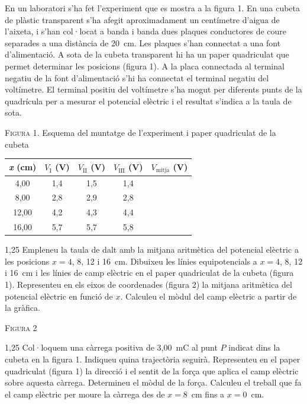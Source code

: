 En un laboratori s'ha fet l'experiment que es mostra a la figura 1. En una cubeta de plàstic transparent s'ha afegit aproximadament un centímetre d'aigua de l'aixeta, i s'han col·locat a banda i banda dues plaques conductores de coure separades a una distància de 20~cm. Les plaques s'han connectat a una font d'alimentació. A sota de la cubeta transparent hi ha un paper quadriculat que permet determinar les posicions (figura 1). A la placa connectada al terminal negatiu de la font d'alimentació s'hi ha connectat el terminal negatiu del voltímetre. El terminal positiu del voltímetre s'ha mogut per diferents punts de la quadrícula per a mesurar el potencial elèctric i el resultat s'indica a la taula de sota.

\begin{center}
\textsc{Figura 1}. Esquema del muntatge de l'experiment i paper quadriculat de la cubeta
\end{center}

\begin{center}
\begin{tabular}{|c|c|c|c|c|}
\hline
\textit{x} (cm) & $V_\mathrm{I}$ (V) & $V_\mathrm{II}$ (V) & $V_\mathrm{III}$ (V) & $V_\mathrm{mitj\grave{a}}$ (V) \\
\hline
4,00 & 1,4 & 1,5 & 1,4 & \\
\hline
8,00 & 2,8 & 2,9 & 2,8 & \\
\hline
12,00 & 4,2 & 4,3 & 4,4 & \\
\hline
16,00 & 5,7 & 5,7 & 5,8 & \\
\hline
\end{tabular}
\end{center}

\begin{apartat}{1,25}
Empleneu la taula de dalt amb la mitjana aritmètica del potencial elèctric a les posicions $x = 4$, 8, 12 i 16~cm. Dibuixeu les línies equipotencials a $x = 4$, 8, 12 i 16~cm i les línies de camp elèctric en el paper quadriculat de la cubeta (figura 1). Representeu en els eixos de coordenades (figura 2) la mitjana aritmètica del potencial elèctric en funció de $x$. Calculeu el mòdul del camp elèctric a partir de la gràfica.
\end{apartat}

\begin{center}
\textsc{Figura 2}
\end{center}

\begin{apartat}{1,25}
Col·loquem una càrrega positiva de 3,00~mC al punt $P$ indicat dins la cubeta en la figura 1. Indiqueu quina trajectòria seguirà. Representeu en el paper quadriculat (figura 1) la direcció i el sentit de la força que aplica el camp elèctric sobre aquesta càrrega. Determineu el mòdul de la força. Calculeu el treball que fa el camp elèctric per moure la càrrega des de $x = 8$~cm fins a $x = 0$~cm.
\end{apartat}

